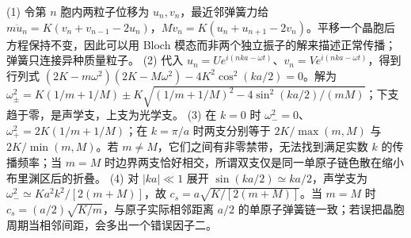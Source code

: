 (1) 令第 \(n\) 胞内两粒子位移为 \(u_n,v_n\)，最近邻弹簧力给 \(m\ddot u_n=K(v_n+v_{n-1}-2u_n)\)，\(M\ddot v_n=K(u_n+u_{n+1}-2v_n)\)。平移一个晶胞后方程保持不变，因此可以用 Bloch 模态而非两个独立振子的解来描述正常传播；弹簧只连接异种质量粒子。
(2) 代入 \(u_n=Ue^{i(nka-\omega t)}\)、\(v_n=Ve^{i(nka-\omega t)}\)，得到行列式 \((2K-m\omega^2)(2K-M\omega^2)-4K^2\cos^2(ka/2)=0\)。解为 \(\omega_\pm^2=K(1/m+1/M)\pm K\sqrt{(1/m+1/M)^2-4\sin^2(ka/2)/(mM)}\)；下支趋于零，是声学支，上支为光学支。
(3) 在 \(k=0\) 时 \(\omega_-^2=0\)、\(\omega_+^2=2K(1/m+1/M)\)；在 \(k=\pi/a\) 时两支分别等于 \(2K/\max(m,M)\) 与 \(2K/\min(m,M)\)。若 \(m\ne M\)，它们之间有非零禁带，无法找到满足实数 \(k\) 的传播频率；当 \(m=M\) 时边界两支恰好相交，所谓双支仅是同一单原子链色散在缩小布里渊区后的折叠。
(4) 对 \(|ka|\ll1\) 展开 \(\sin(ka/2)\simeq ka/2\)，声学支为 \(\omega_-^2\simeq Ka^2k^2/[2(m+M)]\)，故 \(c_s=a\sqrt{K/[2(m+M)]}\)。当 \(m=M\) 时 \(c_s=(a/2)\sqrt{K/m}\)，与原子实际相邻距离 \(a/2\) 的单原子弹簧链一致；若误把晶胞周期当相邻间距，会多出一个错误因子二。
